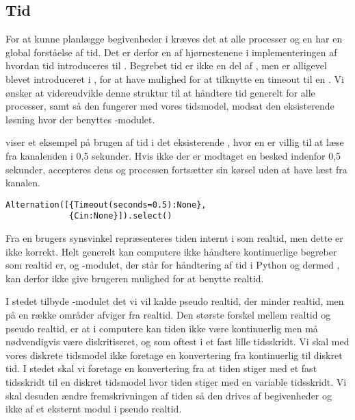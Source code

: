 \subsection{Tid} \label{sec:tid}
For at kunne planlægge begivenheder i \des kræves det at alle processer og \sched en har en global forståelse af tid.  Det er derfor en af hjørnestenene i implementeringen af \des hvordan tid introduceres til \pycsp.  
Begrebet tid er ikke en del af \csp, men er alligevel blevet introduceret i \pycsp, for  at  have
mulighed for at tilknytte en timeout til en . Vi ønsker
at videreudvikle denne struktur til at håndtere tid generelt for alle
processer, samt så den fungerer med vores tidsmodel, modsat den eksisterende
løsning hvor der benyttes -modulet.
 
 viser et eksempel på brugen af tid i det eksisterende \pycsp, hvor en  er villig
til at læse fra kanalenden  i 0,5 sekunder. Hvis ikke der
er modtaget en besked indenfor 0,5 sekunder, accepteres dens 
og processen fortsætter sin kørsel uden at have læst fra kanalen.

\begin{lstlisting}[float=hbtp, 
label=Timeout,caption=Timeout i Alternation (fra dokumentationen til PyCSP)]
Alternation([{Timeout(seconds=0.5):None}, 
             {Cin:None}]).select()
\end{lstlisting}


Fra en brugers synsvinkel repræsenteres tiden internt i \pycsp som realtid, men dette er ikke korrekt. Helt generelt kan computere ikke håndtere kontinuerlige begreber som realtid er, og -modulet, der står for håndtering af tid i Python og dermed \pycsp, kan derfor ikke give brugeren mulighed for at benytte realtid. 

 I stedet tilbyde -modulet det vi vil kalde pseudo realtid, der minder realtid, men på en række områder afviger fra realtid. Den største forskel mellem realtid og pseudo realtid, er at i computere kan tiden ikke være kontinuerlig men må nødvendigvis være diskritiseret, og som oftest i et fast lille tidsskridt. Vi skal med vores diskrete tidsmodel ikke foretage en konvertering fra kontinuerlig til diskret tid. I stedet skal vi foretage en konvertering fra at tiden stiger med et fast tidsskridt til en diskret tidsmodel hvor tiden stiger med en variable tidsskridt. Vi skal desuden ændre fremskrivningen af tiden så den  drives af begivenheder og ikke af et eksternt modul i pseudo realtid. 
 
